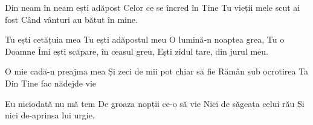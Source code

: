 
\beginverse
Din neam în neam ești adăpost
Celor ce se încred în Tine
Tu vieții mele scut ai fost
Când vânturi au bătut în mine.
\endverse

\beginchorus
Tu ești cetățuia mea
Tu ești adăpostul meu
O lumină-n noaptea grea, Tu o Doamne
Îmi ești scăpare, în ceasul greu,
Ești zidul tare, din jurul meu.
\endchorus

\beginverse
O mie cadă-n preajma mea
Și zeci de mii pot chiar să fie
Rămân sub ocrotirea Ta
Din Tine fac nădejde vie
\endverse

\beginverse
Eu niciodată nu mă tem
De groaza nopții ce-o să vie
Nici de săgeata celui rău
Și nici de-aprinsa lui urgie.
\endverse

\endsong